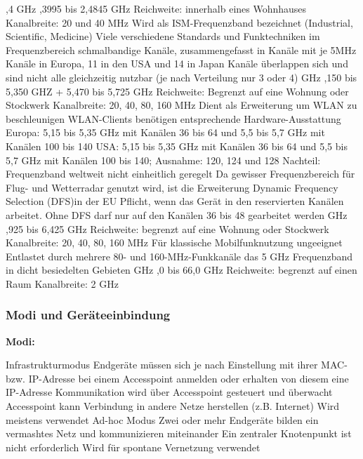 \documentclass[asp1.tex]{subfiles}
\begin{document}
\begin{outline}
    ,4 GHz
        ,3995 bis 2,4845 GHz
        \2 Reichweite: innerhalb eines Wohnhauses
        \2 Kanalbreite: 20 und 40 MHz
        \2 Wird als ISM-Frequenzband bezeichnet (Industrial, Scientific, Medicine)
        \2 Viele verschiedene Standards und Funktechniken im Frequenzbereich
         schmalbandige Kanäle, zusammengefasst in Kanäle mit je 5MHz
         Kanäle in Europa, 11 in den USA und 14 in Japan
        \2 Kanäle überlappen sich und sind nicht alle gleichzeitig nutzbar (je nach Verteilung nur 3 oder 4)
     GHz
        ,150 bis 5,350 GHZ + 5,470 bis 5,725 GHz
        \2 Reichweite: Begrenzt auf eine Wohnung oder Stockwerk
        \2 Kanalbreite: 20, 40, 80, 160 MHz
        \2 Dient als Erweiterung um WLAN zu beschleunigen
        \2 WLAN-Clients benötigen entsprechende Hardware-Ausstattung
        \2 Europa: 5,15 bis 5,35 GHz mit Kanälen 36 bis 64 und 5,5 bis 5,7 GHz mit Kanälen 100 bis 140
        \2 USA: 5,15 bis 5,35 GHz mit Kanälen 36 bis 64 und 5,5 bis 5,7 GHz mit Kanälen 100 bis 140; Ausnahme: 120, 124 und 128
        \2 Nachteil: Frequenzband weltweit nicht einheitlich geregelt
        \2 Da gewisser Frequenzbereich für Flug- und Wetterradar genutzt wird, ist die Erweiterung Dynamic Frequency Selection (DFS)in der EU Pflicht, wenn das Gerät in den reservierten Kanälen arbeitet.
        \2 Ohne DFS darf nur auf den Kanälen 36 bis 48 gearbeitet werden
     GHz
        ,925 bis 6,425 GHz
        \2 Reichweite: begrenzt auf eine Wohnung oder Stockwerk
        \2 Kanalbreite: 20, 40, 80, 160 MHz
        \2 Für klassische Mobilfunknutzung ungeeignet
        \2 Entlastet durch mehrere 80- und 160-MHz-Funkkanäle das 5 GHz Frequenzband in dicht besiedelten Gebieten
     GHz
        ,0 bis 66,0 GHz
        \2 Reichweite: begrenzt auf einen Raum
        \2 Kanalbreite: 2 GHz
\end{outline}

\subsubsection{Modi und Geräteeinbindung}

\textbf{Modi:}
\begin{outline}
    \1 Infrastrukturmodus
        \2 Endgeräte müssen sich je nach Einstellung mit ihrer MAC- bzw. IP-Adresse bei einem Accesspoint anmelden oder erhalten von diesem eine IP-Adresse
        \2 Kommunikation wird über Accesspoint gesteuert und überwacht
        \2 Accesspoint kann Verbindung in andere Netze herstellen (z.B. Internet)
        \2 Wird meistens verwendet
    \1 Ad-hoc Modus
        \2 Zwei oder mehr Endgeräte bilden ein vermashtes Netz und kommunizieren miteinander
        \2 Ein zentraler Knotenpunkt ist nicht erforderlich
        \2 Wird für spontane Vernetzung verwendet
\end{outline}
\end{document}
